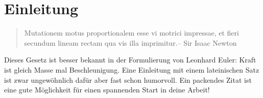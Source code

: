 \chapter{Einleitung}\label{ch:Einleitung}
\begin{quote}
	\glqq Mutationem motus proportionalem esse vi motrici impressae, et fieri secundum lineam rectam qua vis illa imprimitur.\grqq { }-- Sir Isaac Newton
\end{quote}
Dieses Gesetz ist besser bekannt in der Formulierung von Leonhard Euler: Kraft ist gleich Masse mal Beschleunigung. Eine Einleitung mit einem lateinischen Satz ist zwar ungewöhnlich dafür aber fast schon humorvoll. Ein packendes Zitat ist eine gute Möglichkeit für einen spannenden Start in deine Arbeit!